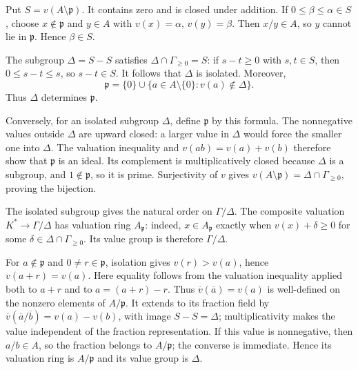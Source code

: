 Put $S=v(A\setminus\mathfrak{p})$. It contains zero and is closed under addition. If $0\leq\beta\leq\alpha\in S$, choose $x\notin\mathfrak{p}$ and $y\in A$ with $v(x)=\alpha$, $v(y)=\beta$. Then $x/y\in A$, so $y$ cannot lie in $\mathfrak{p}$. Hence $\beta\in S$.

The subgroup $\Delta=S-S$ satisfies $\Delta\cap\Gamma_{\geq0}=S$: if $s-t\geq0$ with $s,t\in S$, then $0\leq s-t\leq s$, so $s-t\in S$. It follows that $\Delta$ is isolated. Moreover,
\[\mathfrak{p}=\{0\}\cup\{a\in A\setminus\{0\}:v(a)\notin\Delta\}.\]
Thus $\Delta$ determines $\mathfrak{p}$.

Conversely, for an isolated subgroup $\Delta$, define $\mathfrak{p}$ by this formula. The nonnegative values outside $\Delta$ are upward closed: a larger value in $\Delta$ would force the smaller one into $\Delta$. The valuation inequality and $v(ab)=v(a)+v(b)$ therefore show that $\mathfrak{p}$ is an ideal. Its complement is multiplicatively closed because $\Delta$ is a subgroup, and $1\notin\mathfrak{p}$, so it is prime. Surjectivity of $v$ gives $v(A\setminus\mathfrak{p})=\Delta\cap\Gamma_{\geq0}$, proving the bijection.

The isolated subgroup gives the natural order on $\Gamma/\Delta$. The composite valuation $K^*\to\Gamma/\Delta$ has valuation ring $A_{\mathfrak{p}}$: indeed, $x\in A_{\mathfrak{p}}$ exactly when $v(x)+\delta\geq0$ for some $\delta\in\Delta\cap\Gamma_{\geq0}$. Its value group is therefore $\Gamma/\Delta$.

For $a\notin\mathfrak{p}$ and $0\neq r\in\mathfrak{p}$, isolation gives $v(r)>v(a)$, hence $v(a+r)=v(a)$. Here equality follows from the valuation inequality applied both to $a+r$ and to $a=(a+r)-r$. Thus $\overline v(\overline a)=v(a)$ is well-defined on the nonzero elements of $A/\mathfrak{p}$. It extends to its fraction field by $\overline v(\overline a/\overline b)=v(a)-v(b)$, with image $S-S=\Delta$; multiplicativity makes the value independent of the fraction representation. If this value is nonnegative, then $a/b\in A$, so the fraction belongs to $A/\mathfrak{p}$; the converse is immediate. Hence its valuation ring is $A/\mathfrak{p}$ and its value group is $\Delta$.
